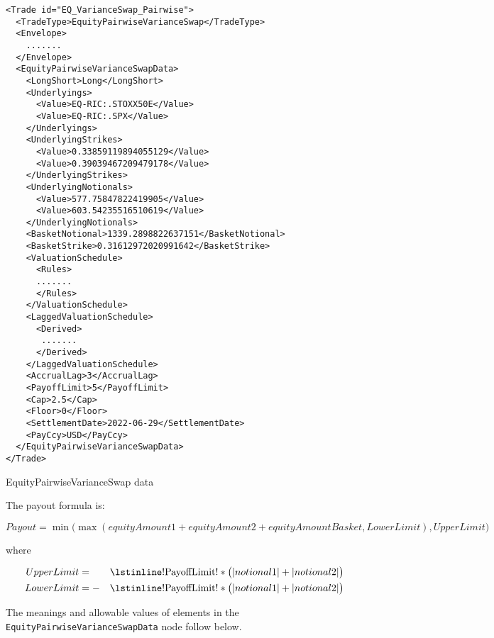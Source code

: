 \begin{listing}[H]
\begin{verbatim}
<Trade id="EQ_VarianceSwap_Pairwise">
  <TradeType>EquityPairwiseVarianceSwap</TradeType>
  <Envelope>
    .......
  </Envelope>
  <EquityPairwiseVarianceSwapData>
    <LongShort>Long</LongShort>
    <Underlyings>
      <Value>EQ-RIC:.STOXX50E</Value>
      <Value>EQ-RIC:.SPX</Value>
    </Underlyings>
    <UnderlyingStrikes>
      <Value>0.33859119894055129</Value>
      <Value>0.39039467209479178</Value>
    </UnderlyingStrikes>
    <UnderlyingNotionals>
      <Value>577.75847822419905</Value>
      <Value>603.54235516510619</Value>
    </UnderlyingNotionals>
    <BasketNotional>1339.2898822637151</BasketNotional>
    <BasketStrike>0.31612972020991642</BasketStrike>
    <ValuationSchedule>
      <Rules>
      .......
      </Rules>
    </ValuationSchedule>
    <LaggedValuationSchedule>
      <Derived>
       .......
      </Derived>
    </LaggedValuationSchedule>
    <AccrualLag>3</AccrualLag>
    <PayoffLimit>5</PayoffLimit>
    <Cap>2.5</Cap>
    <Floor>0</Floor>
    <SettlementDate>2022-06-29</SettlementDate>
    <PayCcy>USD</PayCcy>
  </EquityPairwiseVarianceSwapData>
</Trade>
\end{verbatim}
\caption{EquityPairwiseVarianceSwap data}
\label{lst:eqpairwisevarianceswap_data}
\end{listing}

The payout formula is:

\begin{equation*}
  Payout = \min \Big( \max(equityAmount1 + equityAmount2 + equityAmountBasket, LowerLimit), UpperLimit \Big)
\end{equation*}

where

\begin{align*}
  UpperLimit &= &&\text{\lstinline!PayoffLimit!} * \big( |notional1| + |notional2| \big) \\
  LowerLimit &= - &&\text{\lstinline!PayoffLimit!} * \big( |notional1| + |notional2| \big)
\end{align*}

The meanings and allowable values of elements in the \lstinline!EquityPairwiseVarianceSwapData! node follow below.

